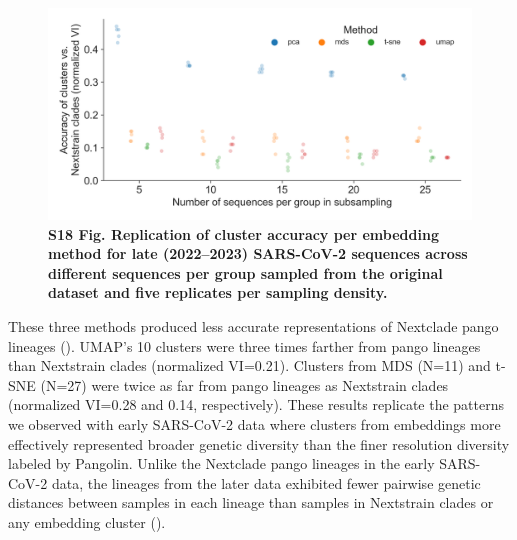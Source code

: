 \documentclass[10pt,letterpaper]{article}
\begin{document}
\begin{figure}[!h]
\includegraphics[width=\columnwidth]{figures/sarscov2-test-replication-of-cluster-accuracy.png}
\caption*{{\bf S18 Fig. Replication of cluster accuracy per embedding method for late (2022--2023) SARS-CoV-2 sequences across different sequences per group sampled from the original dataset and five replicates per sampling density.}}
\end{figure}

These three methods produced less accurate representations of Nextclade pango lineages ().
UMAP's 10 clusters were three times farther from pango lineages than Nextstrain clades (normalized VI=0.21).
Clusters from MDS (N=11) and t-SNE (N=27) were twice as far from pango lineages as Nextstrain clades (normalized VI=0.28 and 0.14, respectively).
These results replicate the patterns we observed with early SARS-CoV-2 data where clusters from embeddings more effectively represented broader genetic diversity than the finer resolution diversity labeled by Pangolin.
Unlike the Nextclade pango lineages in the early SARS-CoV-2 data, the lineages from the later data exhibited fewer pairwise genetic distances between samples in each lineage than samples in Nextstrain clades or any embedding cluster ().
\end{document}

